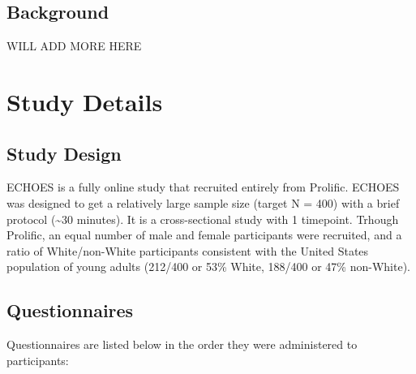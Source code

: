 \documentclass[
]{book}
\begin{document}
\hypertarget{background}{%
\section{Background}\label{background}}

WILL ADD MORE HERE

\hypertarget{study-details}{%
\chapter{Study Details}\label{study-details}}

\hypertarget{study-design}{%
\section{Study Design}\label{study-design}}

ECHOES is a fully online study that recruited entirely from Prolific. ECHOES was designed to get a relatively large sample size (target N = 400) with a brief protocol (\textasciitilde30 minutes). It is a cross-sectional study with 1 timepoint. Trhough Prolific, an equal number of male and female participants were recruited, and a ratio of White/non-White participants consistent with the United States population of young adults (212/400 or 53\% White, 188/400 or 47\% non-White).

\hypertarget{questionnaires}{%
\section{Questionnaires}\label{questionnaires}}

Questionnaires are listed below in the order they were administered to participants:
\end{document}
